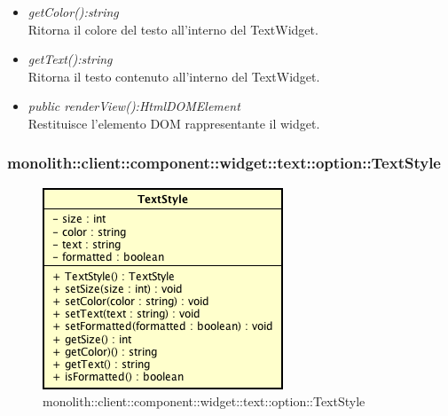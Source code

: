 \begin{itemize}
\begin{itemize}
\begin{itemize}
		\end{itemize} 
	\item \textit{getColor():string}\\
	Ritorna il colore del testo all'interno del TextWidget.
	\item \textit{getText():string}\\
	Ritorna il testo contenuto all'interno del TextWidget.
	\item \textit{public renderView():HtmlDOMElement}\\
	Restituisce l'elemento DOM rappresentante il widget.
	\end{itemize}
\end{itemize}

\subsubsection{monolith::client::component::widget::text::option::TextStyle}

\label{monolith::client::component::widget::text::option::TextStyle}
\begin{figure}[H]
	\centering
	\includegraphics[scale=0.5]{Sezioni/SottosezioniST/img/TextStyle.png}
	\caption{monolith::client::component::widget::text::option::TextStyle}
\end{figure}

